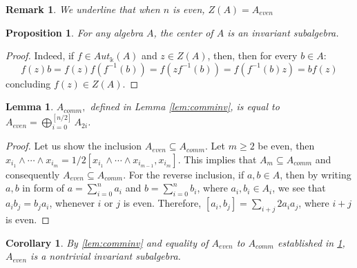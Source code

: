 \documentclass[12pt]{article}
\newtheorem{lemma}[theorem]{Lemma}
\newtheorem{proposition}[theorem]{Proposition}
\newtheorem{corollary}[theorem]{Corollary}
\newtheorem{remark}[theorem]{Remark}
\numberwithin{theorem}{section}
\numberwithin{equation}{theorem}
\newcommand{\kk}{\mathds{k}}
\begin{document}
\begin{remark}
    We underline that when $n$ is even, $Z(A) = A_{even}$
\end{remark}

\begin{proposition}
For any algebra $A$, the center of $A$ is an invariant subalgebra.
\end{proposition}
\begin{proof}
Indeed, if $f \in Aut_\kk (A)$ and $z \in Z(A)$, then, then for every $b \in A$:
$$ f(z) b = 
f(z) f (f^{- 1} (b) ) = f (z f^{- 1} (b) ) = f ( f^{- 1} (b) z  ) = b f(z) $$
concluding $f(z) \in Z(A)$. 
\end{proof}

\begin{lemma} \label{lem:commeven}
    $A_{comm},$ defined in Lemma \ref{lem:comminv}, is equal to
    $A_{even} = \bigoplus _{i = 0} ^{[n/2]} A_{2i}$. 
\end{lemma}
\begin{proof}   
    Let us show the inclusion $A_{even} \subseteq A_{comm}$. Let $m \geq 2 $ be even, then $ x_{i_1} \wedge \cdots \wedge x_{i_m} = 
    1/2 [ x_{i_1} \wedge \cdots \wedge x_{i_{m -1}}, x_{i_m} ]$. This implies that $A_m \subseteq A_{comm}$ and consequently $A_{even} \subseteq A_{comm}$. For the reverse inclusion, if $ a, b \in A$, then 
    by writing $a, b $ in form of $a = \sum _{i = 0} ^n a_i $ and  $b = \sum _{i = 0} ^n b_i $, where $a_i, b_i \in A_i$, we see that $a_i b_ j = b_j a_i$, whenever $ i $ or $j$ is 
    even. Therefore, $ [a_i, b_j] = \sum
    _{i + j}2 a_i a_j$, where $ i+ j$ is even.  
\end{proof}



\begin{corollary}\label{cor:eveninv}
    By \ref{lem:comminv} and equality of $A_{even}$ to $A_{comm}$ established in \ref{lem:commeven}, $A_{even}$ is a nontrivial invariant subalgebra.
\end{corollary}
\end{document}
